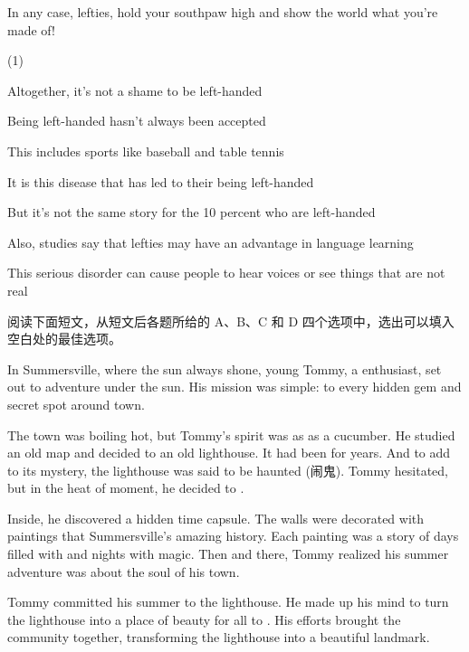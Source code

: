 \documentclass{英语试卷}
\begin{document}
\par In any case, lefties, hold your southpaw high and show the world what you're made of!\par
\begin{choices}(1)
  \item Altogether, it's not a shame to be left-handed
  \item Being left-handed hasn't always been accepted
  \item This includes sports like baseball and table tennis
  \item It is this disease that has led to their being left-handed
  \item But it's not the same story for the 10 percent who are left-handed
  \item Also, studies say that lefties may have an advantage in language learning
  \item This serious disorder can cause people to hear voices or see things that are not real
\end{choices}
\par 阅读下面短文，从短文后各题所给的 A、B、C 和 D 四个选项中，选出可以填入空白处的最佳选项。\par
\par In Summersville, where the sun always shone, young Tommy, a  enthusiast, set out to adventure under the sun. His mission was simple: to  every hidden gem and secret spot around town.\par
\par The town was boiling hot, but Tommy's spirit was as  as a cucumber. He studied an old map and decided to  an old lighthouse. It had been  for years. And to add to its mystery, the lighthouse was said to be haunted (闹鬼). Tommy hesitated, but in the heat of moment, he decided to .\par
\par Inside, he discovered a hidden time capsule. The walls were decorated with paintings that  Summersville's amazing history. Each painting was a story of days filled with  and nights with magic. Then and there, Tommy realized his summer adventure was about  the soul of his town.\par
\par Tommy committed his summer to  the lighthouse. He made up his mind to turn the lighthouse into a place of beauty for all to . His efforts brought the community together, transforming the  lighthouse into a beautiful landmark.\par
\end{document}
